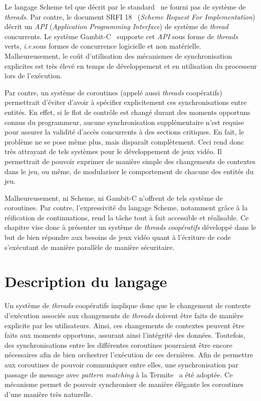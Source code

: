 \documentclass[12pt,oneside,letterpaper,francais]{book}
\newcommand{\ie}{{\textit{i.e.}}}
\begin{document}
Le langage Scheme tel que décrit par le standard~\cite{R5RS} ne fourni
pas de système de \textit{threads}. Par contre, le document SRFI
18~\cite{SRFI18} (\textit{Scheme Request For Implementation}) décrit
un \textit{API} (\textit{Application Programming Interface}) de
système de \textit{thread} concurrents. Le système
Gambit-C~\cite{Gambit4} supporte cet \textit{API} sous forme de
\textit{threads} verts, \ie  sous formes de concurrence logicielle et
non matérielle. Malheureusement, le coût d'utilisation des mécanismes
de synchronisation explicites est très élevé en temps de développement
et en utilisation du processeur lors de l'exécution.

Par contre, un système de coroutines (appelé aussi \textit{threads}
coopératifs) permettrait d'éviter d'avoir à spécifier explicitement
ces synchronisations entre entités. En effet, si le flot de contrôle
est changé durant des moments opportuns connus du programmeur, aucune
synchronisation supplémentaire n'est requise pour assurer la validité
d'accès concurrents à des sections critiques. En fait, le problème ne
se pose même plus, mais disparaît complètement. Ceci rend donc très
attrayant de tels systèmes pour le développement de jeux vidéo. Il
permettrait de pouvoir exprimer de manière simple des changements de
contextes dans le jeu, ou même, de modulariser le comportement de
chacune des entités du jeu.

Malheureusement, ni Scheme, ni Gambit-C n'offrent de tels système de
coroutines. Par contre, l'expressivité du langage Scheme, notamment
grâce à la réification de continuations, rend la tâche tout à fait
accessible et réalisable. Ce chapitre vise donc à présenter un système
de \textit{threads} \emph{coopératifs} développé dans le but de bien
répondre aux besoins de jeux vidéo quant à l'écriture de code
s'exécutant de manière parallèle de manière sécuritaire.


\section{Description du langage}

Un système de \textit{threads} coopératifs implique donc que le
changement de contexte d'exécution associés aux changements de
\textit{threads} doivent être faits de manière explicite par les
utilisateurs. Ainsi, ces changements de contextes peuvent être faits
aux moments opportuns, assurant ainsi l'intégrité des
données. Toutefois, des synchronisations entre les différentes
coroutines pourraient être encore nécessaires afin de bien orchestrer
l'exécution de ces dernières. Afin de permettre aux coroutines de
pouvoir communiquer entre elles, une synchronisation par passage de
message avec \textit{pattern matching} à la
Termite~\cite{Termite_paper} a été adoptée. Ce mécanisme permet de
pouvoir synchroniser de manière élégante les coroutines d'une manière
très naturelle.
\end{document}
